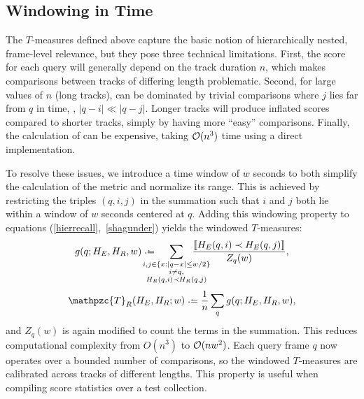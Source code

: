 \documentclass{article}
\def\shag{\ensuremath{\mathpzc{T}}}
\begin{document}

\subsection{Windowing in Time}
\label{sec:window}

The $T$-measures defined above capture the basic notion of hierarchically nested, frame-level relevance, but
they pose three technical limitations.
First, the score for each query will generally depend on the track duration $n$, which makes comparisons between tracks of differing length problematic.  
Second, for large values of $n$ (long tracks),  can be dominated by trivial comparisons
where $j$ lies far from $q$ in time, \ie, $|q-i| \ll |q-j|$.
Longer tracks will produce inflated scores compared to shorter tracks, simply by having more ``easy'' comparisons.
Finally, the calculation of  can be expensive, taking
$\mathcal{O}(n^3)$ time using a direct implementation.

To resolve these issues, we introduce a time window of $w$ seconds to both simplify the 
calculation of the metric and normalize its range.  This is achieved by
restricting the triples $(q,i,j)$ in the summation such that $i$ and $j$ both lie within
a window of $w$ seconds centered at $q$.
Adding this windowing property to equations (\ref{hierrecall},~\ref{shagunder}) yields the windowed $T$-measures:
\begin{equation}
    g(q ; H_E, H_R, w) \defeq \hspace{-1.5em} \sum_{\substack{
        i, j \in \{x : |q-x| \leq w/2\}\\ 
  i \neq q,\\
  H_R(q, i) \prec H_R(q, j) }}
  \hspace{-2em} \frac{\ind{H_E(q, i) \prec H_E(q,
  j)}}{Z_q(w)},\label{windowrecall}
\end{equation}
\begin{equation}
\shag_R(H_E, H_R ; w) \defeq \frac{1}{n} \sum_q g(q ; H_E, H_R, w),
\end{equation}
and $Z_q(w)$ is again modified to count the terms in the summation.
This reduces computational complexity from $O(n^3)$ to $\mathcal{O}(nw^2)$.
Each query frame $q$ now operates over a bounded number of comparisons, 
so the windowed $T$-measures are calibrated across tracks of different lengths.
This property is useful when compiling score statistics over a test collection.
\end{document}
